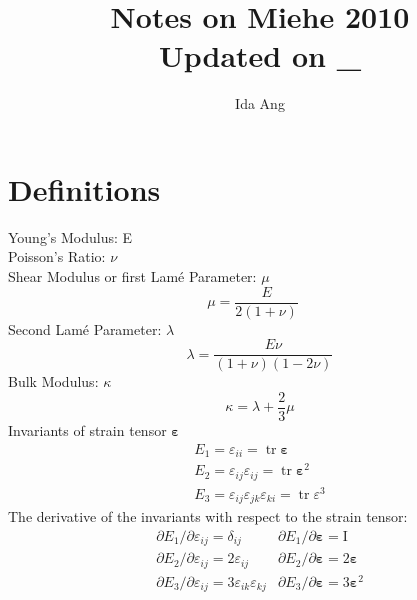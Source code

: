 \documentclass[12pt,3p]{article}
\numberwithin{equation}{section}
\begin{document}
\title{Notes on Miehe 2010 \\
	\large{Updated on \_}}
\author{Ida Ang}
\date{\vspace{-5ex}}
\maketitle

\tableofcontents
\newpage

\section{Definitions}
Young's Modulus: E \\
Poisson's Ratio: $\nu$ \\
Shear Modulus or first Lamé Parameter: $\mu$ 
\begin{equation}
\mu = \frac{E}{2 (1 + \nu)} \quad 
\end{equation}
Second Lamé Parameter: $\lambda$ 
\begin{equation}\label{EqLame}
\lambda = \frac{E \nu}{(1+ \nu) (1 - 2 \nu)} 
\end{equation}
Bulk Modulus: $\kappa$ \\ 
\begin{equation}\label{EqBulk}
\kappa = \lambda + \frac{2}{3} \mu 
\end{equation}
Invariants of strain tensor $\boldsymbol{\varepsilon}$
\begin{equation}
\begin{array}{l}
E_{1}=\varepsilon_{i i}=\operatorname{tr} \boldsymbol{\varepsilon} \\
E_{2}=\varepsilon_{i j} \varepsilon_{i j}=\operatorname{tr} \boldsymbol{\varepsilon}^{2} \\
E_{3}=\varepsilon_{i j} \varepsilon_{j k} \varepsilon_{k i}=\operatorname{tr} \varepsilon^{3}
\end{array}
\end{equation}
The derivative of the invariants with respect to the strain tensor: 
\begin{equation}
\begin{array}{ll}
\partial E_{1} / \partial \varepsilon_{i j}=\delta_{i j} & \partial E_{1} / \partial \boldsymbol{\varepsilon}=\mathrm{I} \\
\partial E_{2} / \partial \varepsilon_{i j}=2 \varepsilon_{i j} & \partial E_{2} / \partial \boldsymbol{\varepsilon}=2 \boldsymbol{\varepsilon} \\
\partial E_{3} / \partial \varepsilon_{i j}=3 \varepsilon_{i k} \varepsilon_{k j} & \partial E_{3} / \partial \boldsymbol{\varepsilon}=3 \boldsymbol{\varepsilon}^{2}
\end{array}
\end{equation}
\end{document}
